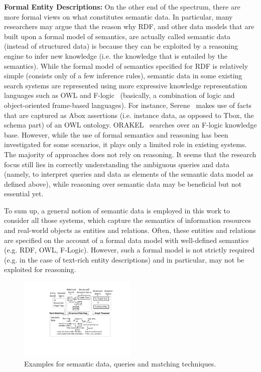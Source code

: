 \textbf{Formal Entity Descriptions:} On the other end of the spectrum, there are more formal views on what constitutes semantic data. In particular, many researchers may argue that the reason why RDF, and other data models that are built upon a formal model of semantics, are actually called semantic data (instead of structured data) is because they can be exploited by a reasoning engine to infer new knowledge (i.e. the knowledge that is entailed by the semantics). While the formal model of semantics specified for RDF is relatively simple (consists only of a few inference rules), semantic data in some existing search systems are represented using more expressive knowledge representation languages such as OWL and F-logic~\cite{DBLP:conf/sigmod/KiferL89} (basically, a combination of logic and object-oriented frame-based languages). For instance, Serene~\cite{DBLP:journals/ws/FazzingaGGL11} makes use of facts that are captured as Abox assertions (i.e. instance data, as opposed to Tbox, the schema part) of an OWL ontology. ORAKEL~\cite{DBLP:journals/dke/CimianoHHMS08} searches over an F-logic knowledge base. However, while the use of formal semantics and reasoning has been investigated for some scenarios, it plays only a limited role in existing systems. The 
majority of approaches does not rely on reasoning. It seems that the research focus still lies in correctly understanding the ambiguous queries and data (namely, to interpret queries and data as elements of the semantic data model as defined above), while reasoning over semantic data may be beneficial but not essential yet. 

To sum up, a general notion of semantic data is employed in this work to consider all those systems, which capture the semantics of information resources and real-world objects as entities and relations. Often, these entities and relations are specified on the account of a formal data model with well-defined semantics (e.g. RDF, OWL, F-Logic). However, such a formal model is not strictly required (e.g. in the case of text-rich entity descriptions) and in particular, may not be exploited for reasoning. 
	
\begin{figure}[thb]
	\centering
		\includegraphics[width=0.5\textwidth]{figs/matching}
	\caption{Examples for semantic data, queries and matching techniques.}
	\label{fig:matching}
\end{figure}


